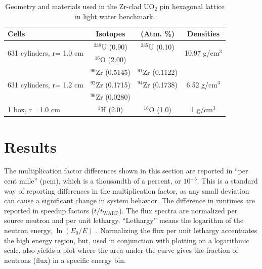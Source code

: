 \documentclass[preprint,12pt]{elsarticle}
\begin{document}
\begin{table}[h]
\centering
\caption{Geometry and materials used in the Zr-clad UO$_2$ pin hexagonal lattice in light water benchmark.}
\label{hex_geom}
\begin{tabular}{| l | c  c | c |}
\hline
Cells & Isotopes & (Atm. \%) & Densities \\
\hline
\multirow{2}{*}{631 cylinders, r= 1.0 cm }  &   $^{238}$U   (0.90)   &    $^{235}$U   (0.10)  &  \multirow{2}{*}{10.97 g/cm$^3$} \\
                                           &   $^{16}$O    (2.00)   &                        &  \\
\hline
\multirow{3}{*}{631 cylinders, r= 1.2 cm }  &   $^{90}$Zr   (0.5145) &    $^{91}$Zr   (0.1122)&  \multirow{3}{*}{6.52 g/cm$^3$} \\
                                           &   $^{92}$Zr   (0.1715) &    $^{94}$Zr   (0.1738)& \\
                                           &   $^{96}$Zr   (0.0280) &                        & \\
\hline
\multirow{1}{*}{1 box, r= 1.0 cm }         &   $^{1}$H     (2.0)    &   $^{16}$O  (1.0) & \multirow{1}{*}{1 g/cm$^3$} \\
\hline
\end{tabular}
\end{table}




\newpage
\section{Results}
\label{sec:results}


The multiplication factor differences shown in this section are reported in ``per cent mille'' (pcm), which is a thousandth of a percent, or $10^{-5}$.  This is a standard way of reporting differences in the multiplication factor, as any small deviation can cause a significant change in system behavior.
The difference in runtimes are reported in speedup factors ($t/t_\mathrm{WARP}$).
  The flux spectra are normalized per source neutron and per unit lethargy.   ``Lethargy'' means the logarithm of the neutron energy, $\ln(E_0/E)$ \cite{duderstadt}.  Normalizing the flux per unit lethargy accentuates the high energy region, but, used in conjunction with plotting on a logarithmic scale, also yields a plot where the area under the curve gives the fraction of neutrons (flux) in a specific energy bin.  
\end{document}
